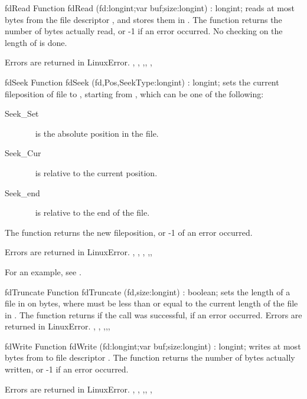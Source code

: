 
\begin{function}{fdRead}
\Declaration
Function fdRead (fd:longint;var buf;size:longint) : longint;
\Description
  reads at most  bytes from the file descriptor
, and stores them in . 
The function returns the number of bytes actually read, or -1 if
an error occurred.
No checking on the length of  is done.

\Errors
Errors are returned in LinuxError.
\SeeAlso
{}, , ,,
, 
\end{function}


\begin{function}{fdSeek}
\Declaration
Function fdSeek (fd,Pos,SeekType:longint) : longint;
\Description
{} sets the current fileposition of file  to
, starting from , which can be one of the following:
\begin{description}
\item [Seek\_Set] \  is the absolute position in the file.
\item [Seek\_Cur] \  is relative to the current position.
\item [Seek\_end] \  is relative to the end of the file.
\end{description}
The function returns the new fileposition, or -1 of an error occurred.

\Errors
Errors are returned in LinuxError.
\SeeAlso
{}, , ,
,,
\end{function}
For an example, see .

\begin{function}{fdTruncate}
\Declaration
Function fdTruncate (fd,size:longint) : boolean;
\Description
{} sets the length of a file in  on 
bytes, where  must be less than or equal to the current length of
the file in .
The function returns  if the call was successful,  if
an error occurred.
\Errors
Errors are returned in LinuxError.
\SeeAlso
{}, , ,,,
\end{function}

\begin{function}{fdWrite}
\Declaration
Function fdWrite (fd:longint;var buf;size:longint) : longint;
\Description
{} writes at most  bytes from  to
file descriptor .
The function returns the number of bytes actually written, or -1 if an error
occurred.

\Errors
Errors are returned in LinuxError.
\SeeAlso
{}, , ,,
, 
\end{function}

